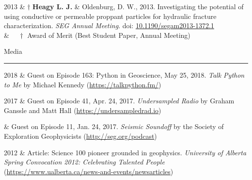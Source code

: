\documentclass[a4paper, 11pt]{article}
\newcommand{\doi}[1]{doi: \href{https://doi.org/#1}{#1}}
\newcommand{\heading}[1]{
    \begin{minipage}[t]{\textwidth}
    \vspace{0.1cm}
    {\LARGE #1}\\
    \vspace{-0.24cm}
    \hrule
    \end{minipage}
    \vspace{0.05cm}

}
\begin{document}
\begin{entryright}
2013 & $\dagger$ \textbf{Heagy L. J.} \& Oldenburg, D. W., 2013. Investigating the potential of using conductive or permeable proppant particles for hydraulic fracture characterization. \emph{SEG Annual Meeting}. \doi{10.1190/segam2013-1372.1} \\
& $\quad\dagger$ Award of Merit (Best Student Paper, Annual Meeting)
\end{entryright}




\heading{Media}

\begin{entryright}
2018 & Guest on Episode 163: Python in Geoscience, May 25, 2018. \emph{Talk Python to Me} by Michael Kennedy (\href{https://talkpython.fm/episodes/show/163/python-in-geoscience}{https://talkpython.fm/})
\end{entryright}

\begin{entryright}
2017 & Guest on Episode 41, Apr. 24, 2017. \emph{Undersampled Radio} by Graham Ganssle and Matt Hall (\href{https://undersampledrad.io/home/2017/4/inverterizer}{https://undersampledrad.io})
\end{entryright}

\begin{entryright}
 & Guest on Episode 11, Jan. 24, 2017. \emph{Seismic Soundoff} by the Society of Exploration Geophysicists (\href{http://seg.org/podcast/Post/4610/Episode-11-Geophysical-Electromagnetics-2017-DISC}{http://seg.org/podcast})
\end{entryright}

\begin{entryright}
2012 & Article: Science 100 pioneer grounded in geophysics. \emph{University of Alberta Spring Convocation 2012: Celebrating Talented People} (\href{https://www.ualberta.ca/news-and-events/newsarticles/2012/06/science100pioneergroundedingeophysics}{https://www.ualberta.ca/news-and-events/newsarticles})
\end{entryright}
\end{document}

